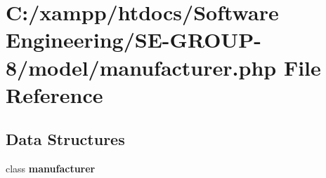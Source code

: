 \section{C\+:/xampp/htdocs/\+Software Engineering/\+S\+E-\/\+G\+R\+O\+U\+P-\/8/model/manufacturer.php File Reference}
\label{manufacturer_8php}
\subsection*{Data Structures}
\begin{DoxyCompactItemize}
\item 
class {\bf manufacturer}
\end{DoxyCompactItemize}
